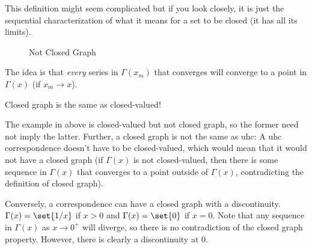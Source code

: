 \documentclass{article}
\begin{document}
This definition might seem complicated but if you look closely, it is just the sequential characterization of what it means for a set to be closed (it has all its limits).
\begin{figure}[H]
  \centering
  \caption{Not Closed Graph}
  \label{fig:not_closed_graph}
\end{figure}

The idea is that \textit{every} series in $\Gamma(x_m)$ that converges will converge to a point in $\Gamma(x)$ (if $x_m \to x$).
\begin{remark}
  Closed graph is  the same as closed-valued!

  The example in  above is closed-valued but not closed graph, so the former need not imply the latter. Further, a closed graph is not the same as uhc: A uhc correspondence doesn't have to be closed-valued, which would mean that it would not have a closed graph (if $\Gamma(x)$ is not closed-valued, then there is some sequence in $\Gamma(x)$ that converges to a point outside of $\Gamma(x)$, contradicting the definition of closed graph).

  Conversely, a correspondence can have a closed graph with a discontinuity. $\Gamma(x) = \set{1/x}$ if $x > 0$ and $\Gamma(x) = \set{0}$ if $x = 0$. Note that any sequence in $\Gamma(x)$ as $x \to 0^+$ will diverge, so there is no contradiction of the closed graph property. However, there is clearly a discontinuity at $0$.
\end{remark}
\end{document}
